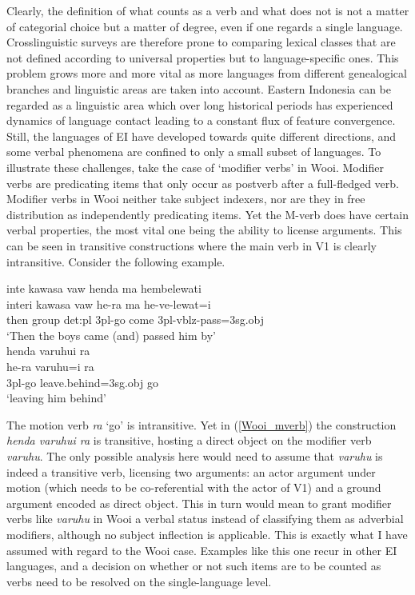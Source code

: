 Clearly, the definition of what counts as a verb and what does not is not a matter of categorial choice but a matter of degree, even if one regards a single language. Crosslinguistic surveys are therefore prone to comparing lexical classes that are not defined according to universal properties but to language-specific ones. This problem grows more and more vital as more languages from different genealogical branches and linguistic areas are taken into account. Eastern Indonesia can be regarded as a linguistic area which over long historical periods has experienced dynamics of language contact leading to a constant flux of feature convergence. Still, the languages of EI have developed towards quite different directions, and some verbal phenomena are confined to only a small subset of languages. To illustrate these challenges, take the case of `modifier verbs' in Wooi. Modifier verbs are predicating items that only occur as postverb after a full-fledged verb. Modifier verbs in Wooi neither take subject indexers, nor are they in free distribution as independently predicating items. Yet the M-verb does have certain verbal properties, the most vital one being the ability to license arguments. This can be seen in transitive constructions where the main verb in V1 is clearly intransitive. Consider the following example.

\pex 
\a
\gll inte kawasa vaw henda ma hembelewati \\
interi kawasa vaw he-ra ma he-ve-lewat=i \\
\glc then group \acs{det}:\acs{pl} \acs{3}\acs{pl}-go come \acs{3}\acs{pl}-\acs{vblz}-pass=\acs{3}\acs{sg}.\acs{obj} \\
\glft `Then the boys came (and) passed him by' \\ 
\z
\a \label{Wooi_mverb}
\gla henda varuhui ra \\ 
he-ra varuhu=i ra \\
\glc \acs{3}\acs{pl}-go leave.behind=\acs{3}\acs{sg}.\acs{obj} go \\
\glft `leaving him behind' \\ 
\z
\xe

The motion verb \textit{ra} `go' is intransitive. Yet in (\ref{Wooi_mverb}) the construction \textit{henda varuhui ra} is transitive, hosting a direct object on the modifier verb \textit{varuhu}. The only possible analysis here would need to assume that \textit{varuhu} is indeed a transitive verb, licensing two arguments: an actor argument under motion (which needs to be co-referential with the actor of V1) and a ground argument encoded as direct object. This in turn would mean to grant modifier verbs like \textit{varuhu} in Wooi a verbal status instead of classifying them as adverbial modifiers, although no subject inflection is applicable. This is exactly what I have assumed with regard to the Wooi case. Examples like this one recur in other EI languages, and a decision on whether or not such items are to be counted as verbs need to be resolved on the single-language level.

